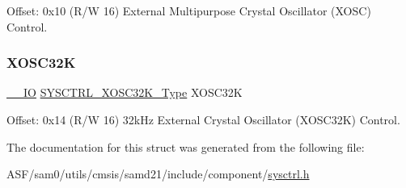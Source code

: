 Offset\+: 0x10 (R/W 16) External Multipurpose Crystal Oscillator (X\+O\+SC) Control. 

\mbox{\label{struct_sysctrl_a1c2566d752a034eb2954bd034c10f749}} 
\subsubsection{\texorpdfstring{XOSC32K}{XOSC32K}}
{\footnotesize\ttfamily \mbox{\hyperlink{core__cm0plus_8h_aec43007d9998a0a0e01faede4133d6be}{\+\_\+\+\_\+\+IO}} \mbox{\hyperlink{union_s_y_s_c_t_r_l___x_o_s_c32_k___type}{S\+Y\+S\+C\+T\+R\+L\+\_\+\+X\+O\+S\+C32\+K\+\_\+\+Type}} X\+O\+S\+C32K}



Offset\+: 0x14 (R/W 16) 32k\+Hz External Crystal Oscillator (X\+O\+S\+C32K) Control. 



The documentation for this struct was generated from the following file\+:\begin{DoxyCompactItemize}
\item 
A\+S\+F/sam0/utils/cmsis/samd21/include/component/\mbox{\hyperlink{component_2sysctrl_8h}{sysctrl.\+h}}\end{DoxyCompactItemize}
